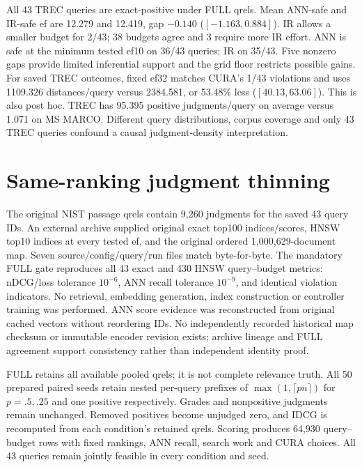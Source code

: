 \documentclass[10pt,twocolumn]{article}
\begin{document}
All 43 TREC queries are exact-positive under FULL qrels. Mean ANN-safe and IR-safe ef are 12.279 and 12.419, gap $-0.140$ ($[-1.163,0.884]$). IR allows a smaller budget for 2/43; 38 budgets agree and 3 require more IR effort. ANN is safe at the minimum tested ef10 on 36/43 queries; IR on 35/43. Five nonzero gaps provide limited inferential support and the grid floor restricts possible gains.
For saved TREC outcomes, fixed ef32 matches CURA's 1/43 violations and uses 1109.326 distances/query versus 2384.581, or 53.48\% less ($[40.13,63.06]$). This is also post hoc.
TREC has 95.395 positive judgments/query on average versus 1.071 on MS MARCO. Different query distributions, corpus coverage and only 43 TREC queries confound a causal judgment-density interpretation.

\section{Same-ranking judgment thinning}
The original NIST passage qrels contain 9,260 judgments for the saved 43 query IDs. An external archive supplied original exact top100 indices/scores, HNSW top10 indices at every tested ef, and the original ordered 1,000,629-document map. Seven source/config/query/run files match byte-for-byte. The mandatory FULL gate reproduces all 43 exact and 430 HNSW query--budget metrics: nDCG/loss tolerance $10^{-6}$, ANN recall tolerance $10^{-9}$, and identical violation indicators. No retrieval, embedding generation, index construction or controller training was performed. ANN score evidence was reconstructed from original cached vectors without reordering IDs. No independently recorded historical map checksum or immutable encoder revision exists; archive lineage and FULL agreement support consistency rather than independent identity proof.

FULL retains all available pooled qrels; it is not complete relevance truth. All 50 prepared paired seeds retain nested per-query prefixes of $\max(1,\lceil pn\rceil)$ for $p=.5,.25$ and one positive respectively. Grades and nonpositive judgments remain unchanged. Removed positives become unjudged zero, and IDCG is recomputed from each condition's retained qrels. Scoring produces 64,930 query--budget rows with fixed rankings, ANN recall, search work and CURA choices. All 43 queries remain jointly feasible in every condition and seed.
\end{document}
